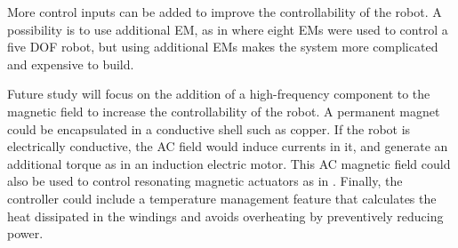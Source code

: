   \par
More control inputs can be added to improve the controllability of the robot. 
A possibility is to use additional EM, as in \cite{kummer2010octomag} where eight EMs were used to control a five DOF robot, but using additional EMs makes the system more complicated and expensive to build.
 \par
Future study will focus on the addition of a high-frequency component to the magnetic field to increase the controllability of the robot. 
  A permanent magnet could be encapsulated in a conductive shell such as copper. 
  If the robot is electrically conductive, the AC field would induce currents in it, and generate an additional torque as in an induction electric motor. 
  This AC magnetic field could also be used to control resonating magnetic actuators as in \cite{vollmers2008wireless}. 
  Finally, the controller could include a temperature management feature that calculates the heat dissipated in the windings and avoids overheating by preventively reducing power.
%

